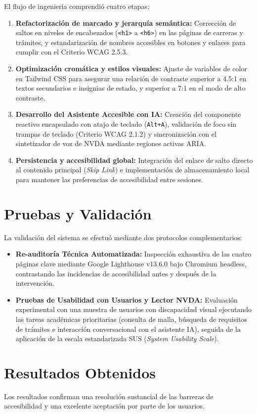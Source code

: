 El flujo de ingeniería comprendió cuatro etapas:
\begin{enumerate}
  \item \textbf{Refactorización de marcado y jerarquía semántica:} Corrección de saltos en niveles de encabezados (\texttt{<h1>} a \texttt{<h6>}) en las páginas de carreras y trámites, y estandarización de nombres accesibles en botones y enlaces para cumplir con el Criterio WCAG 2.5.3.
  \item \textbf{Optimización cromática y estilos visuales:} Ajuste de variables de color en Tailwind CSS para asegurar una relación de contraste superior a 4.5:1 en textos secundarios e insignias de estado, y superior a 7:1 en el modo de alto contraste.
  \item \textbf{Desarrollo del Asistente Accesible con IA:} Creación del componente reactivo encapsulado con atajo de teclado (\texttt{Alt+A}), validación de foco sin trampas de teclado (Criterio WCAG 2.1.2) y sincronización con el sintetizador de voz de NVDA mediante regiones activas ARIA.
  \item \textbf{Persistencia y accesibilidad global:} Integración del enlace de salto directo al contenido principal (\textit{Skip Link}) e implementación de almacenamiento local para mantener las preferencias de accesibilidad entre sesiones.
\end{enumerate}

\section{Pruebas y Validación}
La validación del sistema se efectuó mediante dos protocolos complementarios:
\begin{itemize}
  \item \textbf{Re-auditoría Técnica Automatizada:} Inspección exhaustiva de las cuatro páginas clave mediante Google Lighthouse v13.6.0 bajo Chromium headless, contrastando las incidencias de accesibilidad antes y después de la intervención.
  \item \textbf{Pruebas de Usabilidad con Usuarios y Lector NVDA:} Evaluación experimental con una muestra de usuarios con discapacidad visual ejecutando las tareas académicas prioritarias (consulta de malla, búsqueda de requisitos de trámites e interacción conversacional con el asistente IA), seguida de la aplicación de la escala estandarizada SUS (\textit{System Usability Scale}).
\end{itemize}

\section{Resultados Obtenidos}
Los resultados confirman una resolución sustancial de las barreras de accesibilidad y una excelente aceptación por parte de los usuarios.

